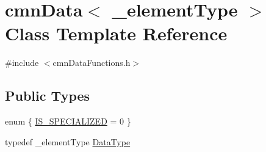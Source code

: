 \hypertarget{classcmn_data}{}\section{cmn\+Data$<$ \+\_\+element\+Type $>$ Class Template Reference}
\label{classcmn_data}


{\ttfamily \#include $<$cmn\+Data\+Functions.\+h$>$}

\subsection*{Public Types}
\begin{DoxyCompactItemize}
\item 
enum \{ \hyperlink{classcmn_data_a8e15f7bac4709a448e12083e816d59dda72e7c5ce850db7c34c87a0e5f4456c30}{I\+S\+\_\+\+S\+P\+E\+C\+I\+A\+L\+I\+Z\+E\+D} = 0
 \}
\item 
typedef \+\_\+element\+Type \hyperlink{classcmn_data_a353bd6bb0af651b6301e5e2e34587da2}{Data\+Type}
\end{DoxyCompactItemize}
